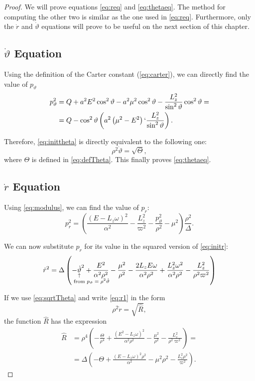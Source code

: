 \begin{proof}
	We will prove equations \ref{eq:req} and \ref{eq:thetaeq}. The method for computing the other two is similar as the one used in \ref{eq:req}. Furthermore, only the $\dot{r}$ and $\dot{\vartheta}$ equations will prove to be useful on the next section of this chapter.
	
	\subsection*{$\dot{\vartheta}$ Equation}
	
	Using the definition of the Carter constant (\autoref{eq:carter}), we can directly find the value of $p_\vartheta$
	\begin{align}
	p_\vartheta^2 &= Q + a^2E^2\cos^2\vartheta - a^2\mu^2\cos^2\vartheta - \frac{L_z^2}{\sin^2\vartheta}\cos^2\vartheta = \\
	&= Q - \cos^2\vartheta\left( a^2\left(\mu^2 - E^2 \right) `\frac{L_z^2}{\sin^2\vartheta} \right).
	\end{align}
	
	Therefore, \autoref{eq:inittheta} is directly equivalent to the following one:
	\begin{equation}
	\label{eq:sqrtTheta}
	\rho^2 \dot{\vartheta} = \sqrt{\Theta},
	\end{equation}
	where $\Theta$ is defined in \autoref{eq:defTheta}. This finally proves \autoref{eq:thetaeq}.
	
	\subsection*{$\dot{r}$ Equation}
	
	Using \autoref{eq:modulus}, we can find the value of $p_r$:
	\[
	p_r^2 = \left( \frac{(E - L_z\omega)^2}{\alpha^2} - \frac{L_z^2}{\varpi^2} - \frac{p_\vartheta^2}{\rho^2} - \mu^2 \right) \frac{\rho^2}{\Delta}.
	\]
	
	We can now substitute $p_r$ for its value in the squared version of \autoref{eq:initr}:
	\begin{equation}
	\label{eq:r1}
	\dot{r}^2 = \Delta \left( -\eqnote{\dot{\vartheta}}{from $p_\vartheta = \rho^2\dot{\vartheta}$}^2 + \frac{E^2}{\alpha^2\rho^2} - \frac{\mu^2}{\rho^2} - \frac{2L_zE\omega}{\alpha^2\rho^2} + \frac{L_z^2\omega^2}{\alpha^2\rho^2} - \frac{L_z^2}{\rho^2\varpi^2} \right)
	\end{equation}
	
	If we use \autoref{eq:sqrtTheta} and write \autoref{eq:r1} in the form
	\[
	\rho^2 \dot{r} = \sqrt{\widehat{R}},
	\]
	the function $\widehat{R}$ has the expression
	\begin{align}
	\nonumber
	\widehat{R} &= \rho^4 \left( -\frac{\Theta}{\rho^4} + \frac{(E^2 - L_z\omega)^2}{\alpha^2\rho^2} - \frac{\mu^2}{\rho^2} - \frac{L_z^2}{\rho^2\varpi^2} \right) = \\
	&= \Delta \left( -\Theta + \frac{(E-L_z\omega)^2\rho^2}{\alpha^2} - \mu^2\rho^2 - \frac{L_z^2 \rho^2}{\varpi^2} \right).
	\label{eq:R1}
	\end{align}
	

\end{proof}
